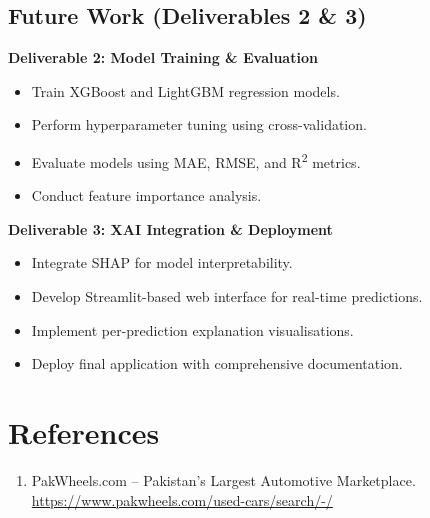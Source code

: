 \documentclass[12pt,a4paper]{article}
\begin{document}
\subsection{Future Work (Deliverables 2 \& 3)}

\textbf{Deliverable 2: Model Training \& Evaluation}
\begin{itemize}
    \item Train XGBoost and LightGBM regression models.
    \item Perform hyperparameter tuning using cross-validation.
    \item Evaluate models using MAE, RMSE, and R\textsuperscript{2} metrics.
    \item Conduct feature importance analysis.
\end{itemize}

\textbf{Deliverable 3: XAI Integration \& Deployment}
\begin{itemize}
    \item Integrate SHAP for model interpretability.
    \item Develop Streamlit-based web interface for real-time predictions.
    \item Implement per-prediction explanation visualisations.
    \item Deploy final application with comprehensive documentation.
\end{itemize}


\section*{References}

\begin{enumerate}
    \item PakWheels.com -- Pakistan's Largest Automotive Marketplace.
          \url{https://www.pakwheels.com/used-cars/search/-/}
\end{enumerate}
\end{document}
